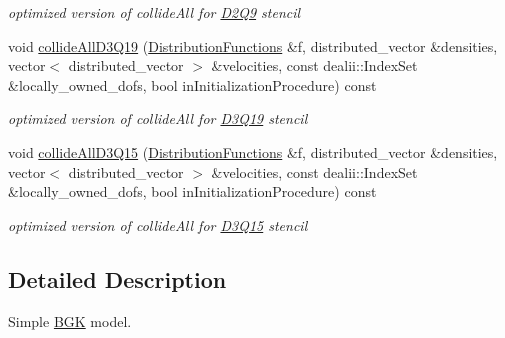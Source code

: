\begin{DoxyCompactItemize}
\begin{DoxyCompactList}\small\item\em optimized version of collideAll for \hyperlink{classnatrium_1_1D2Q9}{D2Q9} stencil \item\end{DoxyCompactList}\item 
\hypertarget{classnatrium_1_1BGKStandard_a7362ff8603390301e8c4062ad348edd1}{
void \hyperlink{classnatrium_1_1BGKStandard_a7362ff8603390301e8c4062ad348edd1}{collideAllD3Q19} (\hyperlink{classnatrium_1_1DistributionFunctions}{DistributionFunctions} \&f, distributed\_\-vector \&densities, vector$<$ distributed\_\-vector $>$ \&velocities, const dealii::IndexSet \&locally\_\-owned\_\-dofs, bool inInitializationProcedure) const }
\label{classnatrium_1_1BGKStandard_a7362ff8603390301e8c4062ad348edd1}

\begin{DoxyCompactList}\small\item\em optimized version of collideAll for \hyperlink{classnatrium_1_1D3Q19}{D3Q19} stencil \item\end{DoxyCompactList}\item 
\hypertarget{classnatrium_1_1BGKStandard_a6ffd7d81aef7a233dd44c46eb539e833}{
void \hyperlink{classnatrium_1_1BGKStandard_a6ffd7d81aef7a233dd44c46eb539e833}{collideAllD3Q15} (\hyperlink{classnatrium_1_1DistributionFunctions}{DistributionFunctions} \&f, distributed\_\-vector \&densities, vector$<$ distributed\_\-vector $>$ \&velocities, const dealii::IndexSet \&locally\_\-owned\_\-dofs, bool inInitializationProcedure) const }
\label{classnatrium_1_1BGKStandard_a6ffd7d81aef7a233dd44c46eb539e833}

\begin{DoxyCompactList}\small\item\em optimized version of collideAll for \hyperlink{classnatrium_1_1D3Q15}{D3Q15} stencil \item\end{DoxyCompactList}\end{DoxyCompactItemize}


\subsection{Detailed Description}
Simple \hyperlink{classnatrium_1_1BGK}{BGK} model. 

